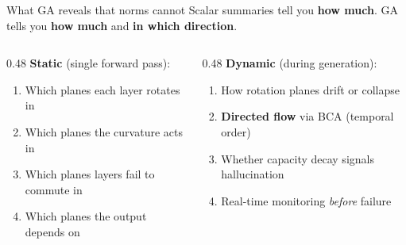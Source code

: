 \documentclass[aspectratio=169, 11pt]{beamer}
\begin{document}
\begin{frame}{What GA reveals that norms cannot}
\vspace{-0.3em}
Scalar summaries tell you \textbf{how much}.
GA tells you \textbf{how much} and \textbf{in which direction}.

\vspace{0.3em}
\begin{columns}[T]
\begin{column}{0.48\textwidth}
\textbf{Static} (single forward pass):
\begin{enumerate}\small
  \item Which planes each layer rotates in
  \item Which planes the curvature acts in
  \item Which planes layers fail to commute in
  \item Which planes the output depends on
\end{enumerate}
\end{column}
\begin{column}{0.48\textwidth}
\textbf{Dynamic} (during generation):
\begin{enumerate}\small\setcounter{enumi}{4}
  \item How rotation planes drift or collapse
  \item \textbf{Directed flow} via BCA (temporal order)
  \item Whether capacity decay signals hallucination
  \item Real-time monitoring \emph{before} failure
\end{enumerate}
\end{column}
\end{columns}

\vspace{0.3em}
\begin{center}
\end{center}
\end{frame}
\end{document}
